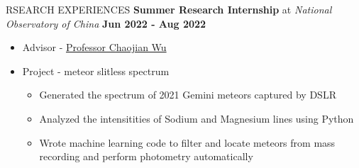 \documentclass[10pt]{article} %
\begin{document}
\begin{section}{RSEARCH EXPERIENCES}
\textbf{Summer Research Internship} at \textit{National Observatory of China} \hfill \textbf{Jun 2022 - Aug 2022} 
\begin{itemize}[leftmargin=1.5em]
    \item Advisor - \href{mailto:chjwu@bao.ac.cn}{Professor Chaojian Wu}
    \item Project - meteor slitless spectrum
    \begin{itemize}[leftmargin=1.5em]
        \item Generated the spectrum of 2021 Gemini meteors captured by DSLR
        \item Analyzed the intensitities of Sodium and Magnesium lines using Python
        \item Wrote machine learning code to filter and locate meteors from mass recording and perform photometry automatically
    \end{itemize}
\end{itemize}


\end{section}
\end{document}
